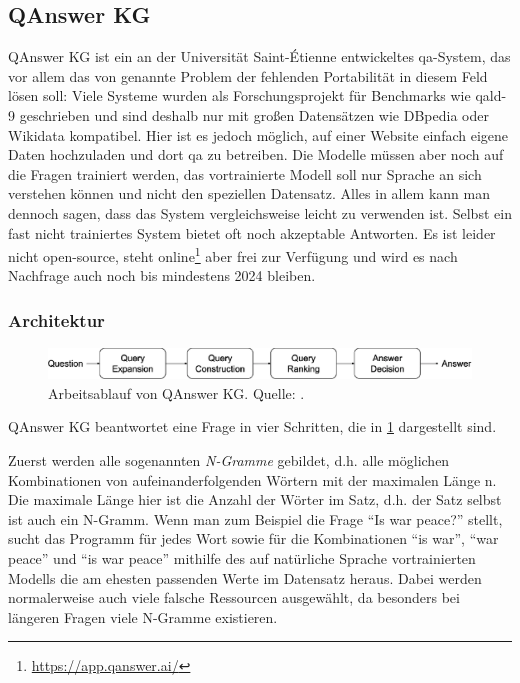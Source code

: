 \subsection{QAnswer KG}

QAnswer KG \citep{qanswer} ist ein an der Universität Saint-Étienne entwickeltes \ac{qa}-System,
das vor allem das von \citet{diefenbachkbqa} genannte Problem der fehlenden Portabilität in diesem Feld lösen soll:
Viele Systeme wurden als Forschungsprojekt für Benchmarks wie \ac{qald}-9 geschrieben und sind deshalb nur mit großen Datensätzen wie DBpedia oder Wikidata kompatibel.
Hier ist es jedoch möglich, auf einer Website einfach eigene Daten hochzuladen und dort \ac{qa} zu betreiben.
Die Modelle müssen aber noch auf die Fragen trainiert werden, das vortrainierte Modell soll nur Sprache an sich verstehen können und nicht den speziellen Datensatz.
Alles in allem kann man dennoch sagen, dass das System vergleichsweise leicht zu verwenden ist.
Selbst ein fast nicht trainiertes System bietet oft noch akzeptable Antworten.
Es ist leider nicht open-source, steht online\footnote{\url{https://app.qanswer.ai/}} aber frei zur Verfügung und wird es nach Nachfrage auch noch bis mindestens 2024 bleiben.

\subsubsection{Architektur}

\begin{figure}%
\centering
\includegraphics[width=\textwidth, height=\textheight, keepaspectratio]{Images/QAnswerWorkflow.png}
\caption[QAnswer KG Arbeitsablauf]{Arbeitsablauf von QAnswer KG. Quelle: \citet{qanswer}.}
\label{fig:qanswerworkflow}
\end{figure}

QAnswer KG beantwortet eine Frage in vier Schritten, die in \cref{fig:qanswerworkflow} dargestellt sind.

Zuerst werden alle sogenannten \emph{N-Gramme} gebildet, d.h. alle möglichen Kombinationen von aufeinanderfolgenden Wörtern mit der maximalen Länge n.
Die maximale Länge hier ist die Anzahl der Wörter im Satz, d.h. der Satz selbst ist auch ein N-Gramm.
Wenn man zum Beispiel die Frage \enquote{Is war peace?} stellt,
sucht das Programm für jedes Wort sowie für die Kombinationen \enquote{is war}, \enquote{war peace} und \enquote{is war peace}
mithilfe des auf natürliche Sprache vortrainierten Modells die am ehesten passenden Werte im Datensatz heraus.
Dabei werden normalerweise auch viele falsche Ressourcen ausgewählt, da besonders bei längeren Fragen viele N-Gramme existieren.

